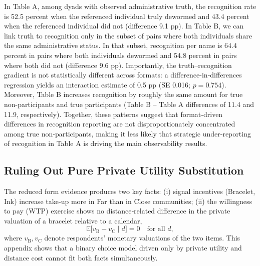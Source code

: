 \documentclass[12pt,a4paper]{article}
\begin{document}
In Table A, among dyads with observed administrative truth, the recognition rate is 52.5 percent when the referenced individual truly dewormed and 43.4 percent when the referenced individual did not (difference 9.1 pp). In Table B, we can link truth to recognition only in the subset of pairs where both individuals share the same administrative status. In that subset, recognition per name is 64.4 percent in pairs where both individuals dewormed and 54.8 percent in pairs where both did not (difference 9.6 pp). Importantly, the truth--recognition gradient is not statistically different across formats: a difference-in-differences regression yields an interaction estimate of 0.5 pp (SE 0.016; $p=0.754$). Moreover, Table B increases recognition by roughly the same amount for true non-participants and true participants (Table B -- Table A differences of 11.4 and 11.9, respectively). Together, these patterns suggest that format-driven differences in recognition reporting are not disproportionately concentrated among true non-participants,  making it less likely that strategic under-reporting of recognition in Table A is driving the main observability results. 










\newpage

\FloatBarrier
\newpage

\setcounter{table}{0}
\renewcommand{\thetable}{G\arabic{table}}

\setcounter{figure}{0}
\renewcommand{\thefigure}{G\arabic{figure}}


\renewcommand{\thesubsection}{\Alph{subsection}}

\subsection{Ruling Out Pure Private Utility Substitution}
\label{sec:mrs}

The reduced form evidence produces two key facts:  
(i) signal incentives (Bracelet, Ink) increase take‑up more in Far than in Close communities;  
(ii) the willingness to pay (WTP) exercise shows no distance‑related difference in the private valuation of a bracelet relative to a calendar,  
\[
\mathbb E\!\bigl[v_{\mathrm B}-v_{\mathrm C}\mid d\bigr]=0
\quad\text{for all } d,
\tag{F.1}
\]
where \(v_{\mathrm B},v_{\mathrm C}\) denote respondents’ monetary valuations of the two items.  
This appendix shows that a binary choice model driven only by private utility and distance cost cannot fit both facts simultaneously.
\end{document}
